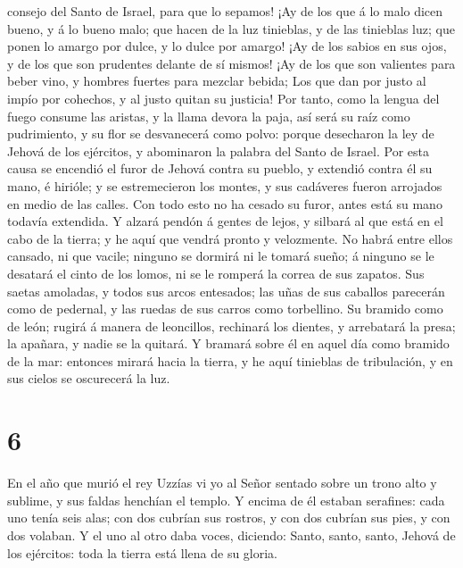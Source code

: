 consejo del Santo de Israel, para que lo sepamos!  ¡Ay de
los que á lo malo dicen bueno, y á lo bueno malo; que hacen de la luz
tinieblas, y de las tinieblas luz; que ponen lo amargo por dulce, y lo
dulce por amargo!  ¡Ay de los sabios en sus ojos, y de los
que son prudentes delante de sí mismos!  ¡Ay de los que son
valientes para beber vino, y hombres fuertes para mezclar bebida;
 Los que dan por justo al impío por cohechos, y al justo
quitan su justicia!  Por tanto, como la lengua del fuego
consume las aristas, y la llama devora la paja, así será su raíz como
pudrimiento, y su flor se desvanecerá como polvo: porque desecharon la
ley de Jehová de los ejércitos, y abominaron la palabra del Santo de
Israel.  Por esta causa se encendió el furor de Jehová
contra su pueblo, y extendió contra él su mano, é hirióle; y se
estremecieron los montes, y sus cadáveres fueron arrojados en medio de
las calles. Con todo esto no ha cesado su furor, antes está su mano
todavía extendida.  Y alzará pendón á gentes de lejos, y
silbará al que está en el cabo de la tierra; y he aquí que vendrá pronto
y velozmente.  No habrá entre ellos cansado, ni que vacile;
ninguno se dormirá ni le tomará sueño; á ninguno se le desatará el cinto
de los lomos, ni se le romperá la correa de sus zapatos. 
Sus saetas amoladas, y todos sus arcos entesados; las uñas de sus
caballos parecerán como de pedernal, y las ruedas de sus carros como
torbellino.  Su bramido como de león; rugirá á manera de
leoncillos, rechinará los dientes, y arrebatará la presa; la apañara, y
nadie se la quitará.  Y bramará sobre él en aquel día como
bramido de la mar: entonces mirará hacia la tierra, y he aquí tinieblas
de tribulación, y en sus cielos se oscurecerá la luz.

\hypertarget{section-5}{%
\section{6}\label{section-5}}

 En el año que murió el rey Uzzías vi yo al Señor sentado
sobre un trono alto y sublime, y sus faldas henchían el templo.
 Y encima de él estaban serafines: cada uno tenía seis alas;
con dos cubrían sus rostros, y con dos cubrían sus pies, y con dos
volaban.  Y el uno al otro daba voces, diciendo: Santo,
santo, santo, Jehová de los ejércitos: toda la tierra está llena de su
gloria.

